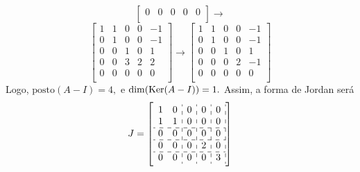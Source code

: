 \documentclass[11pt,a4paper]{article}
\begin{document}
{{\[\begin{bmatrix}
0 & 0 & 0& 0 & 0\\
\end{bmatrix}\rightarrow\]\[
\begin{bmatrix}
1 & 1 & 0& 0& -1\\
0 & 1 & 0& 0 & -1\\
0 & 0 & 1& 0 & 1\\
0 & 0 & 3& 2& 2\\
0 & 0 & 0& 0 & 0\\
\end{bmatrix}\rightarrow
\begin{bmatrix}
1 & 1 & 0& 0& -1\\
0 & 1 & 0& 0 & -1\\
0 & 0 & 1& 0 & 1\\
0 & 0 & 0& 2& -1\\
0 & 0 & 0& 0 & 0\\
\end{bmatrix}
\]
Logo, $\mbox{posto}(A-I) = 4,$ e $\dim(\operatorname{Ker}(A-I)) = 1.$ Assim, a forma de Jordan será
\[J= \left[\begin{array}{cc:c:c:c:c}
1 & 0 & 0 & 0 & 0  \\
1 & 1 & 0 & 0 & 0  \\ \hdashline
0 & 0 & 0 & 0 & 0  \\ \hdashline
0 & 0 & 0 & 2 & 0  \\ \hdashline
0 & 0 & 0 & 0 & 3 \\
\end{array}\right] \]
}
}
\end{document}

